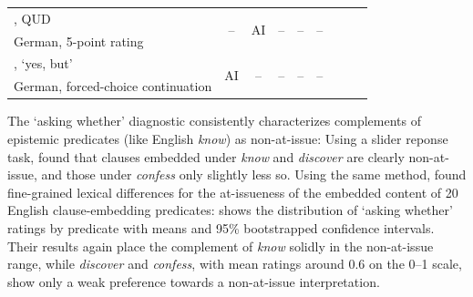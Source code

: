 \documentclass[times,linguex,xcolor]{glossa}
\begin{document}
\begin{table}[ht]
{\begin{tabular}{l c c c cc c c c}
    \citealt{chen_presuppositions_2024}, QUD
        & \multirow{2}{*}{--}
          & \multirow{2}{*}{AI}
            & \multirow{2}{*}{--}
              & \multirow{2}{*}{--}
                & \multirow{2}{*}{--}
                    \\ 
    \scriptsize German, 5-point rating  &  \\ \midrule

    \citealt{xue_correlation_2011}, `yes, but'
        & \multirow{2}{*}{AI}
          & \multirow{2}{*}{--}
            & \multirow{2}{*}{--}
              & \multirow{2}{*}{--}
                & \multirow{2}{*}{--}
                    \\ 
    \scriptsize German, forced-choice continuation  &  \\ \midrule

    \end{tabular}}
  \end{table}

  The `asking whether' diagnostic consistently characterizes complements of epistemic predicates (like English \emph{know}) as non-at-issue: Using a slider reponse task, \citealt{tonhauser_how_2018} found that clauses embedded under \emph{know} and \emph{discover} are clearly non-at-issue, and those under \emph{confess} only slightly less so. Using the same method, \citealt{degen-tonhauser-glossa} found fine-grained lexical differences for the at-issueness of the embedded content of 20 English clause-embedding predicates:  shows the distribution of `asking whether' ratings by predicate with means and 95\% bootstrapped confidence intervals. Their results again place the complement of \emph{know} solidly in the non-at-issue range, while \emph{discover} and \emph{confess}, with mean ratings around $0.6$ on the 0--1 scale, show only a weak preference towards a non-at-issue interpretation.
\end{document}
